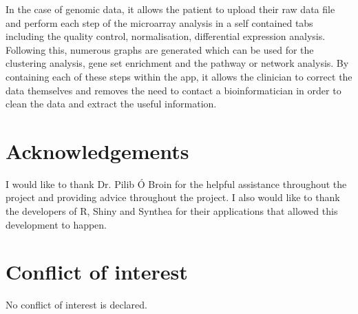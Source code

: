 \documentclass{bioinfo}
\begin{document}
\begin{Discussion}
In the case of genomic data, it allows the patient to upload their raw data file and perform each step of the microarray analysis in a self contained tabs including the quality control, normalisation, differential expression analysis. Following this, numerous graphs are generated which can be used for the clustering analysis, gene set enrichment and the pathway or network analysis. By containing each of these steps within the app, it allows the clinician to correct the data themselves and removes the need to contact a bioinformatician in order to clean the data and extract the useful information.


\end{Discussion} 


%
%




\section*{Acknowledgements}
I would like to thank Dr. Pilib Ó Broin for the helpful assistance throughout the project and providing advice throughout the project. I also would like to thank the developers of R, Shiny and Synthea for their applications that allowed this development to happen.

\vspace*{-12pt}

\section*{Conflict of interest}
No conflict of interest is declared. 


%
%
%
%
%
%
%
%



\end{document}
